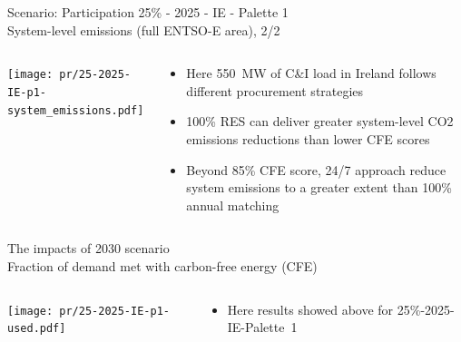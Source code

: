 \begin{frame}{Scenario: Participation 25\% - 2025 - IE - Palette 1 \\
System-level emissions (full ENTSO-E area), 2/2}

\begin{columns}[T]
\begin{column}{9cm}
\centering

\texttt{[image: pr/25-2025-IE-p1-system\_emissions.pdf]}
\end{column}
\begin{column}{5cm}

  \begin{itemize}
   \item  Here 550~MW of C\&I load in Ireland follows different procurement strategies
   \item 100\% RES can deliver greater system-level CO2 emissions reductions than lower CFE scores
   \item \alert{Beyond 85\% CFE score}, 24/7 approach reduce system emissions to a greater extent than 100\% annual matching

  \end{itemize}
\end{column}
\end{columns}

\end{frame}


\begin{frame}{The impacts of 2030 scenario  \\ 
Fraction of demand met with carbon-free energy (CFE) }

\begin{columns}[T]
\begin{column}{9cm}
\centering

\texttt{[image: pr/25-2025-IE-p1-used.pdf]}
\end{column}
\begin{column}{5cm}

  \begin{itemize}
  \item Here results showed above for 25\%-\alert{2025}-IE-Palette~1
  \end{itemize}
  
\end{column}
\end{columns}

\end{frame}



